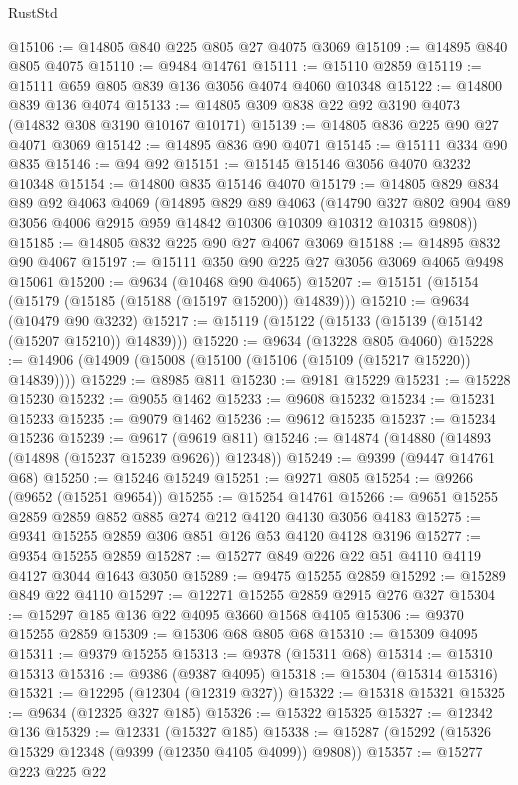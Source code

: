\begin{lexlean}{RustStd}
\begin{coremodule}
@15106 := @14805 @840 @225 @805 @27 @4075 @3069
@15109 := @14895 @840 @805 @4075
@15110 := @9484 @14761
@15111 := @15110 @2859
@15119 := @15111 @659 @805 @839 @136 @3056 @4074 @4060 @10348
@15122 := @14800 @839 @136 @4074
@15133 := @14805 @309 @838 @22 @92 @3190 @4073 (@14832 @308 @3190 @10167 @10171)
@15139 := @14805 @836 @225 @90 @27 @4071 @3069
@15142 := @14895 @836 @90 @4071
@15145 := @15111 @334 @90 @835
@15146 := @94 @92
@15151 := @15145 @15146 @3056 @4070 @3232 @10348
@15154 := @14800 @835 @15146 @4070
@15179 := @14805
    @829
    @834
    @89
    @92
    @4063
    @4069
    (@14895
      @829
      @89
      @4063
      (@14790 @327 @802 @904 @89 @3056 @4006 @2915 @959 @14842 @10306 @10309 @10312 @10315 @9808))
@15185 := @14805 @832 @225 @90 @27 @4067 @3069
@15188 := @14895 @832 @90 @4067
@15197 := @15111 @350 @90 @225 @27 @3056 @3069 @4065 @9498 @15061
@15200 := @9634 (@10468 @90 @4065)
@15207 := @15151 (@15154 (@15179 (@15185 (@15188 (@15197 @15200)) @14839)))
@15210 := @9634 (@10479 @90 @3232)
@15217 := @15119 (@15122 (@15133 (@15139 (@15142 (@15207 @15210)) @14839)))
@15220 := @9634 (@13228 @805 @4060)
@15228 := @14906 (@14909 (@15008 (@15100 (@15106 (@15109 (@15217 @15220)) @14839))))
@15229 := @8985 @811
@15230 := @9181 @15229
@15231 := @15228 @15230
@15232 := @9055 @1462
@15233 := @9608 @15232
@15234 := @15231 @15233
@15235 := @9079 @1462
@15236 := @9612 @15235
@15237 := @15234 @15236
@15239 := @9617 (@9619 @811)
@15246 := @14874 (@14880 (@14893 (@14898 (@15237 @15239 @9626)) @12348))
@15249 := @9399 (@9447 @14761 @68)
@15250 := @15246 @15249
@15251 := @9271 @805
@15254 := @9266 (@9652 (@15251 @9654))
@15255 := @15254 @14761
@15266 := @9651 @15255 @2859 @2859 @852 @885 @274 @212 @4120 @4130 @3056 @4183
@15275 := @9341 @15255 @2859 @306 @851 @126 @53 @4120 @4128 @3196
@15277 := @9354 @15255 @2859
@15287 := @15277 @849 @226 @22 @51 @4110 @4119 @4127 @3044 @1643 @3050
@15289 := @9475 @15255 @2859
@15292 := @15289 @849 @22 @4110
@15297 := @12271 @15255 @2859 @2915 @276 @327
@15304 := @15297 @185 @136 @22 @4095 @3660 @1568 @4105
@15306 := @9370 @15255 @2859
@15309 := @15306 @68 @805 @68
@15310 := @15309 @4095
@15311 := @9379 @15255
@15313 := @9378 (@15311 @68)
@15314 := @15310 @15313
@15316 := @9386 (@9387 @4095)
@15318 := @15304 (@15314 @15316)
@15321 := @12295 (@12304 (@12319 @327))
@15322 := @15318 @15321
@15325 := @9634 (@12325 @327 @185)
@15326 := @15322 @15325
@15327 := @12342 @136
@15329 := @12331 (@15327 @185)
@15338 := @15287 (@15292 (@15326 @15329 @12348 (@9399 (@12350 @4105 @4099)) @9808))
@15357 := @15277
    @223
    @225
    @22

\end{coremodule}
\end{lexlean}
